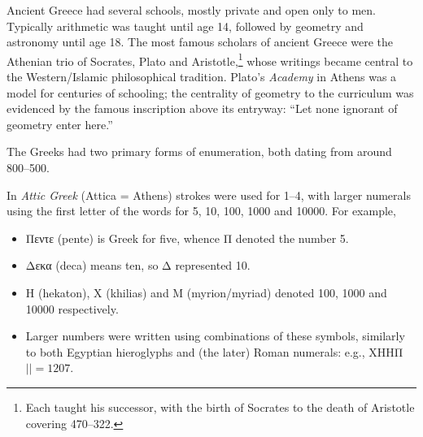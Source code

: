 Ancient Greece had several schools, mostly private and open only to men. %
Typically arithmetic was taught until age 14, followed by geometry and astronomy until age 18. The most famous scholars of ancient Greece were the Athenian trio of Socrates, Plato and Aristotle,\footnote{%
	Each taught his successor, with the birth of Socrates to the death of Aristotle covering 470--322\BC.%
} whose writings became central to the Western/Islamic philosophical tradition. Plato's \emph{Academy} in Athens was a model for centuries of schooling; the centrality of geometry to the curriculum was evidenced by the famous inscription above its entryway: ``Let none ignorant of geometry enter here.''



The Greeks had two primary forms of enumeration, both dating from around 800--500\BC.\smallbreak

In \emph{Attic Greek} (Attica = Athens) strokes were used for 1--4, with larger numerals using the first letter of the words for 5, 10, 100, 1000 and 10000. For example,
\begin{itemize}\itemsep0pt
  \item Πεντε (pente) is Greek for five, whence Π denoted the number 5.
	\item Δεκα (deca) means ten, so Δ represented 10.
	\item Η (hekaton), X (khilias) and M (myrion/myriad) denoted 100, 1000 and 10000 respectively.
	\item Larger numbers were written using combinations of these symbols, similarly to both Egyptian hieroglyphs and (the later) Roman numerals: e.g., ΧΗΗΠ$||=1207$.
\end{itemize}


